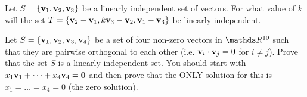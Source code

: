 \begin{problem}{\problemnum}
Let $S=\{\mathbf{v}_1, \mathbf{v}_2, \mathbf{v}_3\}$ be a linearly independent set of vectors. For what value of $k$ will the set $T=\{\mathbf{v}_2-\mathbf{v}_1, k\mathbf{v}_3-\mathbf{v}_2, \mathbf{v}_1-\mathbf{v}_3\}$ be linearly independent.
\end{problem}

\begin{problem}{\problemnum}
Let $S=\{\mathbf{v}_1, \mathbf{v}_2, \mathbf{v}_3, \mathbf{v}_4\}$ be a set of four non-zero vectors in $\bbR^{10}$ such that they are pairwise orthogonal to each other (i.e. $\mathbf{v}_i \cdot \mathbf{v}_j=0$ for $i \neq j$). Prove that the set $S$ is a linearly independent set. You should start with $x_1\mathbf{v}_1+ \dotsb + x_4\mathbf{v}_4=\mathbf{0}$ and then prove that the ONLY solution for this is $x_1=\ldots=x_4=0$ (the zero solution).
\end{problem}

